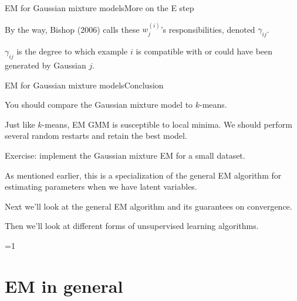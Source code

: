 \documentclass{beamer}
\begin{document}
\begin{frame}{EM for Gaussian mixture models}{More on the E step}

  By the way, Bishop (2006) calls these $w^{(i)}_j$'s
  \alert{responsibilities}, denoted $\gamma_{ij}$.

  \medskip

  $\gamma_{ij}$ is the degree to which example $i$ is compatible with
  or could have been generated by Gaussian $j$.
  
\end{frame}


\begin{frame}{EM for Gaussian mixture models}{Conclusion}

  You should compare the Gaussian mixture model to $k$-means.

  \medskip

  Just like $k$-means, EM GMM is susceptible to \alert{local
    minima}. We should perform several random restarts and retain the
  best model.
  
  \medskip

  \alert{Exercise}: implement the Gaussian mixture EM for a small dataset.

  \medskip

  As mentioned earlier, this is a specialization of the general EM
  algorithm for estimating parameters when we have latent variables.

  \medskip

  Next we'll look at the general EM algorithm and its guarantees on
  convergence.

  \medskip

  Then we'll look at different forms of unsupervised learning algorithms.

\end{frame}

\def\genem{0}
\ifnum\genem=1

\section{EM in general}
\end{document}
